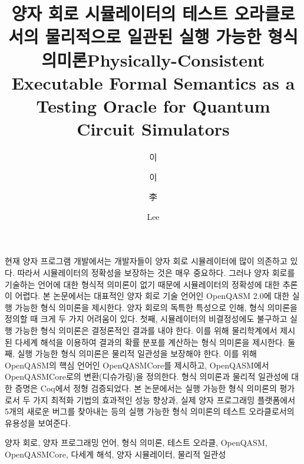 \documentclass[master,english,final]{kaist-ucs} %
\title[korean] {양자 회로 시뮬레이터의 테스트 오라클로서의 물리적으로 일관된 실행 가능한 형식 의미론}
\title[english]{Physically-Consistent Executable Formal Semantics as a Testing Oracle for Quantum Circuit Simulators}
\author[korean] {이}{강 욱}
\author[korean2] {이}{강욱}    %
\author[chinese]{李}{康 旭}
\author[english]{Lee}{Kanguk}
\begin{document}
\newtheorem{postulate}[theorem]{Postulate}


\thesisinfo
\begin{summary}
	현재 양자 프로그램 개발에서는 개발자들이 양자 회로 시뮬레이터에 많이 의존하고 있다.
	따라서 시뮬레이터의 정확성을 보장하는 것은 매우 중요하다.
	그러나 양자 회로를 기술하는 언어에 대한 형식적 의미론이 없기 때문에 시뮬레이터의 정확성에 대한 추론이 어렵다.
	본 논문에서는 대표적인 양자 회로 기술 언어인 OpenQASM 2.0에 대한 실행 가능한 형식 의미론을 제시한다.
	양자 회로의 독특한 특성으로 인해, 형식 의미론을 정의할 때 크게 두 가지 어려움이 있다.
	첫째, 시뮬레이터의 비결정성에도 불구하고 실행 가능한 형식 의미론은 결정론적인 결과를 내야 한다.
	이를 위해 물리학계에서 제시된 다세계 해석을 이용하여 결과의 확률 분포를 계산하는 형식 의미론을 제시한다.
	둘째, 실행 가능한 형식 의미론은 물리적 일관성을 보장해야 한다.
	이를 위해 OpenQASM의 핵심 언어인 OpenQASMCore를 제시하고, OpenQASM에서 OpenQASMCore로의 변환(디슈가링)을 정의한다.
	형식 의미론과 물리적 일관성에 대한 증명은 Coq에서 정형 검증되었다.
	본 논문에서는 실행 가능한 형식 의미론의 평가로서 두 가지 최적화 기법의 효과적인 성능 향상과, 실제 양자 프로그래밍 플랫폼에서 5개의
	새로운 버그를 찾아내는 등의 실행 가능한 형식 의미론의 테스트 오라클로서의 유용성을 보여준다.
\end{summary}

\begin{Korkeyword}
	양자 회로, 양자 프로그래밍 언어, 형식 의미론, 테스트 오라클, OpenQASM, OpenQASMCore, 다세계 해석, 양자 시뮬레이터,
	물리적 일관성
\end{Korkeyword}
\end{document}
